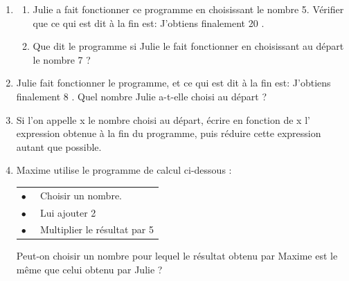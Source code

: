 \begin{enumerate}
\item 
	\begin{enumerate}
		\item Julie a fait fonctionner ce programme en choisissant le nombre 5. Vérifier que
ce qui est dit à la fin est: \og J'obtiens finalement 20 \fg.
		\item Que dit le programme si Julie le fait fonctionner
en choisissant au départ le nombre 7 ?
	\end{enumerate}
\item Julie fait fonctionner le programme, et ce qui est dit à
la fin est: \og J'obtiens finalement 8 \fg.
Quel nombre Julie a-t-elle choisi au départ ?
\item Si l'on appelle x le nombre choisi au départ, écrire en
fonction de x l' expression obtenue à la fin du programme, puis réduire cette expression autant que
possible.
\item Maxime utilise le programme de calcul ci-dessous :
\begin{center}	
\begin{tabularx}{0.5\linewidth}{|l X|}\hline
$\bullet~~$&Choisir un nombre.\\
$\bullet~~$&Lui ajouter 2\\
$\bullet~~$&Multiplier le résultat par 5\\\hline
\end{tabularx}
\end{center}

Peut-on choisir un nombre pour lequel le résultat obtenu par Maxime est le même que celui obtenu par
Julie ?	
\end{enumerate}